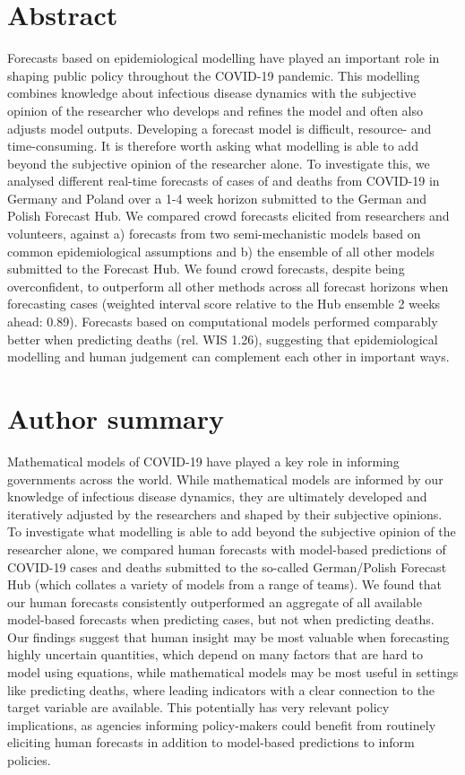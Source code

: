 \documentclass[10pt,letterpaper]{article}
\begin{document}
\section*{Abstract}
Forecasts based on epidemiological modelling have played an important
role in shaping public policy throughout the COVID-19 pandemic. This
modelling combines knowledge about infectious disease dynamics with the
subjective opinion of the researcher who develops and refines the model
and often also adjusts model outputs. Developing a forecast model is
difficult, resource- and time-consuming. It is therefore worth asking
what modelling is able to add beyond the subjective opinion of the
researcher alone. To investigate this, we analysed different real-time
forecasts of cases of and deaths from COVID-19 in Germany and Poland
over a 1-4 week horizon submitted to the German and Polish Forecast Hub.
We compared crowd forecasts elicited from researchers and volunteers,
against a) forecasts from two semi-mechanistic models based on common
epidemiological assumptions and b) the ensemble of all other models
submitted to the Forecast Hub. We found crowd forecasts, despite being
overconfident, to outperform all other methods across all forecast
horizons when forecasting cases (weighted interval score relative to the
Hub ensemble 2 weeks ahead: 0.89). Forecasts based on computational
models performed comparably better when predicting deaths (rel. WIS
1.26), suggesting that epidemiological modelling and human judgement can
complement each other in important ways.

\section*{Author summary}
Mathematical models of COVID-19 have played a key role in informing
governments across the world. While mathematical models are informed by
our knowledge of infectious disease dynamics, they are ultimately
developed and iteratively adjusted by the researchers and shaped by
their subjective opinions. To investigate what modelling is able to add
beyond the subjective opinion of the researcher alone, we compared human
forecasts with model-based predictions of COVID-19 cases and deaths
submitted to the so-called German/Polish Forecast Hub (which collates a
variety of models from a range of teams). \textbar{} We found that our
human forecasts consistently outperformed an aggregate of all available
model-based forecasts when predicting cases, but not when predicting
deaths. Our findings suggest that human insight may be most valuable
when forecasting highly uncertain quantities, which depend on many
factors that are hard to model using equations, while mathematical
models may be most useful in settings like predicting deaths, where
leading indicators with a clear connection to the target variable are
available. This potentially has very relevant policy implications, as
agencies informing policy-makers could benefit from routinely eliciting
human forecasts in addition to model-based predictions to inform
policies.
\end{document}
